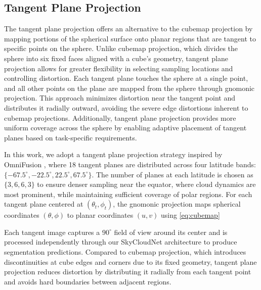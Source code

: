 \subsection{Tangent Plane Projection}
\label{ssec:tangent_projection}

The tangent plane projection offers an alternative to the cubemap projection by mapping portions of the spherical surface onto planar regions that are tangent to specific points on the sphere. Unlike cubemap projection, which divides the sphere into six fixed faces aligned with a cube's geometry, tangent plane projection allows for greater flexibility in selecting sampling locations and controlling distortion. Each tangent plane touches the sphere at a single point, and all other points on the plane are mapped from the sphere through gnomonic projection. This approach minimizes distortion near the tangent point and distributes it radially outward, avoiding the severe edge distortions inherent to cubemap projections. Additionally, tangent plane projection provides more uniform coverage across the sphere by enabling adaptive placement of tangent planes based on task-specific requirements.

In this work, we adopt a tangent plane projection strategy inspired by OmniFusion \cite{li2022omnifusion}, where 18 tangent planes are distributed across four latitude bands: $\{-67.5^\circ, -22.5^\circ, 22.5^\circ, 67.5^\circ\}$. The number of planes at each latitude is chosen as $\{3, 6, 6, 3\}$ to ensure denser sampling near the equator, where cloud dynamics are most prominent, while maintaining sufficient coverage of polar regions. For each tangent plane centered at $(\theta_t, \phi_t)$, the gnomonic projection maps spherical coordinates $(\theta,\phi)$ to planar coordinates $(u,v)$ using \autoref{eq:cubemap}


Each tangent image captures a $90^\circ$ field of view around its center and is processed independently through our SkyCloudNet architecture to produce segmentation predictions. Compared to cubemap projection, which introduces discontinuities at cube edges and corners due to its fixed geometry, tangent plane projection reduces distortion by distributing it radially from each tangent point and avoids hard boundaries between adjacent regions.


